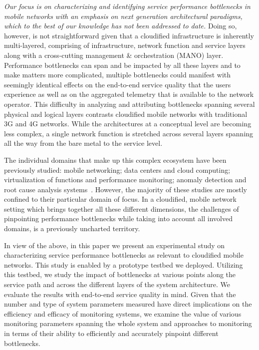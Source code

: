 \documentclass[journal,comsoc]{IEEEtran}
\begin{document}
% 
{\em Our focus is on characterizing and identifying service performance bottlenecks in mobile networks with an emphasis on next generation architectural paradigms, which to the best of our knowledge has not been addressed to date.} 
Doing so, however, is not straightforward given that a cloudified infrastructure is inherently multi-layered, comprising of infrastructure, network function and service layers along with a cross-cutting management \& orchestration (MANO) layer.
Performance bottlenecks can span and be impacted by all these layers and to make matters more complicated, multiple bottlenecks could manifest with seemingly identical effects on the end-to-end service quality that the users experience as well as on the aggregated telemetry that is available to the network operator.
This difficulty in analyzing and attributing bottlenecks spanning several physical and logical layers contrasts cloudified mobile networks with traditional 3G and 4G networks.
While the architectures at a conceptual level are becoming less complex, a single network function is stretched across several layers spanning all the way from the bare metal to the service level.      



%
The individual domains that make up this complex ecosystem have been previously studied: mobile networking; data centers and cloud computing; virtualization of functions and performance monitoring; anomaly detection and root cause analysis systems~\cite{calero2015monpaas,moshref2016trumpet,baranasuriya2015qprobe,sciancalepore2018z}. However, the majority of these studies are mostly confined to their particular domain of focus. 
In a cloudified, mobile network setting which brings together all these different dimensions, the challenges of pinpointing performance bottlenecks while taking into account all involved domains, is a previously uncharted territory.

%
In view of the above, in this paper we present an experimental study on characterizing service performance bottlenecks as relevant to cloudified mobile networks. 
This study is enabled by a prototype testbed we deployed.
Utilizing this testbed, we study the impact of bottlenecks at various points along the service path and across the different layers of the system architecture. 
We evaluate the results with end-to-end service quality in mind. 
Given that the number and type of system parameters 
measured have direct implications on the efficiency and efficacy of monitoring systems, we examine the value of various monitoring parameters spanning the whole system and approaches to monitoring in terms of their ability to efficiently and accurately pinpoint different bottlenecks.
\end{document}
